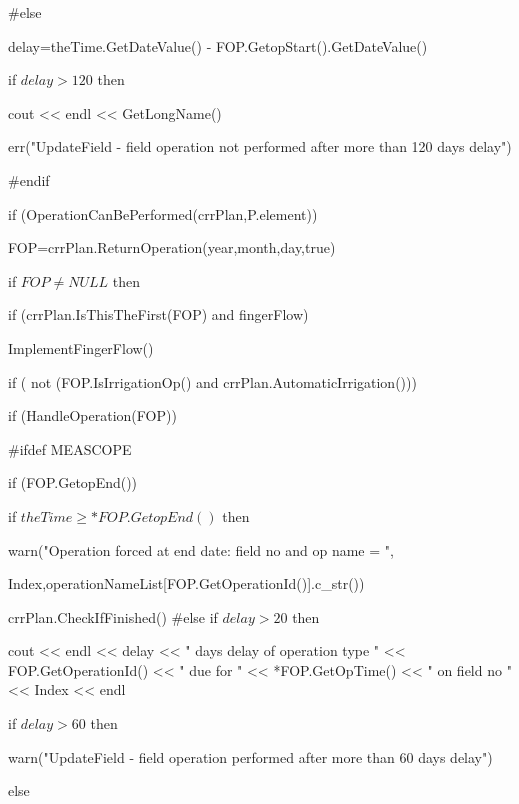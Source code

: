 \documentclass[%
]{scrartcl}
\begin{document}
{{\quad \#else

 \quad         delay=theTime.GetDateValue() - FOP.GetopStart().GetDateValue()

\quad          if $delay>120$ then
         
  \quad \quad           cout << endl << GetLongName()

\quad\quad              err("UpdateField - field operation not performed after more than 120 days delay")
         
\#endif
      
      
      
      if (OperationCanBePerformed(crrPlan,P.element))
      
     \quad     FOP=crrPlan.ReturnOperation(year,month,day,true)
   
     \quad     if $FOP\ne NULL$ then
         
      \quad \quad       if (crrPlan.IsThisTheFirst(FOP) and fingerFlow)
  
    \quad \quad \quad            ImplementFingerFlow()
   
    \quad \quad         if ( not (FOP.IsIrrigationOp() and crrPlan.AutomaticIrrigation()))
            
      \quad \quad \quad          if (HandleOperation(FOP))
               
\#ifdef MEASCOPE
  	
  		\quad \quad \quad 				if (FOP.GetopEnd())
                  {
        \quad \quad \quad              if $theTime\ge *FOP.GetopEnd()$ then
    
      \quad \quad \quad \quad                   warn("Operation forced at end date: field no and op name = ",
     
      \quad \quad \quad                       Index,operationNameList[FOP.GetOperationId()].c\_str())
                  
       \quad \quad \quad             crrPlan.CheckIfFinished()
\#else
                  if $delay>20$ then
                  
      \quad                cout << endl << delay << " days delay of operation type " << FOP.GetOperationId() << " due for " << *FOP.GetOpTime() << " on field no " << Index << endl
 
 \quad                     if $delay>60$ then
  
   \quad \quad                      warn("UpdateField - field operation performed after more than 60 days delay")
    
    \quad                  else
    
}}}
\end{document}
